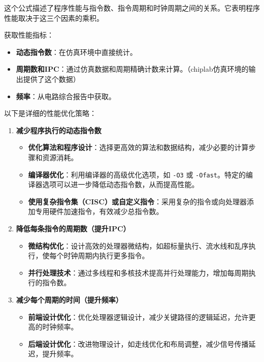 这个公式描述了程序性能与指令数、指令周期和时钟周期之间的关系。它表明程序性能取决于这三个因素的乘积。

获取性能指标：

\begin{itemize}
\tightlist
\item
  \textbf{动态指令数}：在仿真环境中直接统计。
\item
  \textbf{周期数和IPC}：通过仿真数据和周期精确计数来计算。（chiplab仿真环境的输出提供了这个数据）
\item
  \textbf{频率}：从电路综合报告中获取。
\end{itemize}

以下是详细的性能优化策略：

\begin{enumerate}
\def\labelenumi{\arabic{enumi}.}
\tightlist
\item
  \textbf{减少程序执行的动态指令数}

  \begin{itemize}
  \tightlist
  \item
    \textbf{优化算法和程序设计}：选择更高效的算法和数据结构，减少必要的计算步骤和资源消耗。
  \item
    \textbf{编译器优化}：利用编译器的高级优化选项，如 \texttt{-O3} 或 \texttt{-Ofast}。特定的编译器选项可以进一步降低动态指令数，从而提高性能。
  \item
    \textbf{使用复杂指令集（CISC）或自定义指令}：采用复杂的指令或向处理器添加专用硬件加速指令，有效减少总指令数。
  \end{itemize}
\item
  \textbf{降低每条指令的周期数（提升IPC）}

  \begin{itemize}
  \tightlist
  \item
    \textbf{微结构优化}：设计高效的处理器微结构，如超标量执行、流水线和乱序执行，使每个时钟周期内执行更多指令。
  \item
    \textbf{并行处理技术}：通过多线程和多核技术提高并行处理能力，增加每周期执行的指令数。
  \end{itemize}
\item
  \textbf{减少每个周期的时间（提升频率）}

  \begin{itemize}
  \tightlist
  \item
    \textbf{前端设计优化}：优化处理器逻辑设计，减少关键路径的逻辑延迟，允许更高的时钟频率。
  \item
    \textbf{后端设计优化}：改进物理设计，如走线优化和布局调整，减少信号传播延迟，提升频率。
  \end{itemize}
\end{enumerate}

